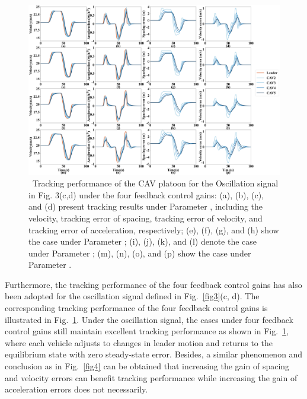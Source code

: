 \documentclass[a4paper]{cas-sc}
\begin{document}
\begin{figure}

  \centering
  \includegraphics[width=14cm]{figs/fig5.png}
  \caption{~Tracking performance of the CAV platoon for the Oscillation signal in Fig. 3(c,d) under the four feedback control gains: (a), (b), (c), and (d) present tracking results under Parameter \uppercase\expandafter{}, including the velocity, tracking error of spacing, tracking error of velocity, and tracking error of acceleration, respectively; (e), (f), (g), and (h) show the case under Parameter \uppercase\expandafter{}; (i), (j), (k), and (l) denote the case under Parameter \uppercase\expandafter{}; (m), (n), (o), and (p) show the case under Parameter \uppercase\expandafter{}.}
  \label{fig5}
\end{figure}

Furthermore, the tracking performance of the four feedback control gains has also been adopted for the oscillation signal defined in Fig.~\ref{fig3}(c, d). The corresponding tracking performance of the four feedback control gains is illustrated in Fig.~\ref{fig5}. Under the oscillation signal, the cases under four feedback control gains still maintain excellent tracking performance as shown in Fig.~\ref{fig5}, where each vehicle adjusts to changes in leader motion and returns to the equilibrium state with zero steady-state error. Besides, a similar phenomenon and conclusion as in Fig.~\ref{fig4} can be obtained that increasing the gain of spacing and velocity errors can benefit tracking performance while increasing the gain of acceleration errors does not necessarily.
\end{document}
